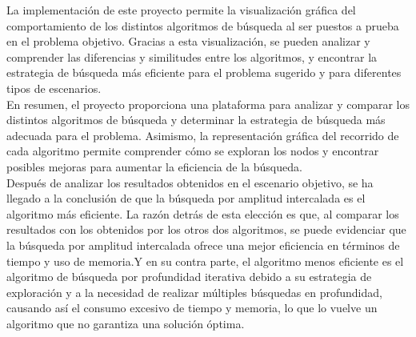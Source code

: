 La implementación de este proyecto permite la visualización gráfica del comportamiento de los distintos algoritmos de búsqueda al ser puestos a prueba en el problema objetivo. Gracias a esta visualización, se pueden analizar y comprender las diferencias y similitudes entre los algoritmos, y encontrar la estrategia de búsqueda más eficiente para el problema sugerido y para diferentes tipos de escenarios.\\

En resumen, el proyecto proporciona una plataforma para analizar y comparar los distintos algoritmos de búsqueda y determinar la estrategia de búsqueda más adecuada para el problema. Asimismo, la representación gráfica del recorrido de cada algoritmo permite comprender cómo se exploran los nodos y encontrar posibles mejoras para aumentar la eficiencia de la búsqueda.\\

Después de analizar los resultados obtenidos en el escenario objetivo, se ha llegado a la conclusión de que la búsqueda por amplitud intercalada es el algoritmo más eficiente. La razón detrás de esta elección es que, al comparar los resultados con los obtenidos por los otros dos algoritmos, se puede evidenciar que la búsqueda por amplitud intercalada ofrece una mejor eficiencia en términos de tiempo y uso de memoria.Y en su contra parte, el algoritmo menos eficiente es el algoritmo de búsqueda por profundidad iterativa debido a su estrategia de exploración y a la necesidad de realizar múltiples búsquedas en profundidad, causando así el consumo excesivo de tiempo y memoria, lo que lo vuelve un algoritmo que no garantiza una solución óptima.
